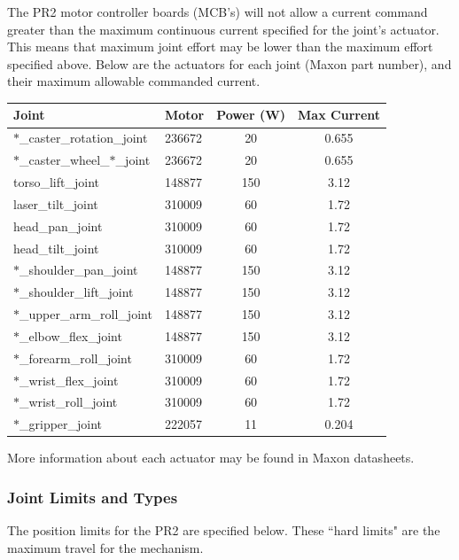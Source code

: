 The PR2 motor controller boards (MCB's) will not allow a current command greater
than the maximum continuous current specified for the joint's actuator. This
means that maximum joint effort may be lower than the maximum effort specified
above. Below are the actuators for each joint (Maxon part number), and their
maximum allowable commanded current.

\begin{tabular}{ll*{2}{c}}
Joint  & Motor & Power (W) & Max Current \\
\hline \hline
$\ast$\_caster\_rotation\_joint       & 236672 & 20  & 0.655 \\
$\ast$\_caster\_wheel\_$\ast$\_joint  & 236672 & 20  & 0.655 \\
torso\_lift\_joint                    & 148877 & 150 & 3.12  \\
laser\_tilt\_joint                    & 310009 & 60  & 1.72  \\
head\_pan\_joint                      & 310009 & 60  & 1.72  \\
head\_tilt\_joint                     & 310009 & 60  & 1.72  \\
$\ast$\_shoulder\_pan\_joint          & 148877 & 150 & 3.12  \\
$\ast$\_shoulder\_lift\_joint         & 148877 & 150 & 3.12  \\
$\ast$\_upper\_arm\_roll\_joint       & 148877 & 150 & 3.12  \\
$\ast$\_elbow\_flex\_joint            & 148877 & 150 & 3.12  \\
$\ast$\_forearm\_roll\_joint          & 310009 & 60  & 1.72  \\
$\ast$\_wrist\_flex\_joint            & 310009 & 60  & 1.72  \\
$\ast$\_wrist\_roll\_joint            & 310009 & 60  & 1.72  \\
$\ast$\_gripper\_joint                & 222057 & 11  & 0.204 \\
\end{tabular}

More information about each actuator may be found in Maxon datasheets.

\subsubsection{Joint Limits and Types}

The position limits for the PR2 are specified below. These ``hard limits" are
the maximum travel for the mechanism.

